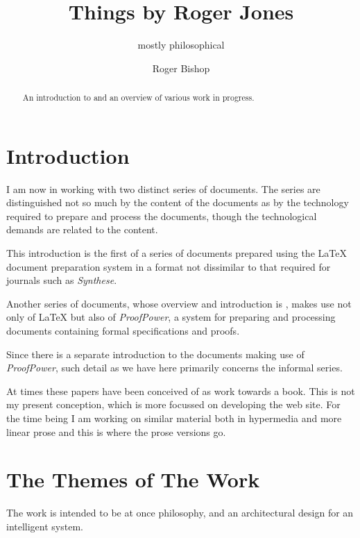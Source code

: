\documentclass[numreferences]{rbjk}
\begin{document}
                                                                                   
\begin{article}
\begin{opening}  
\title{Things by Roger Jones}
\subtitle{mostly philosophical}
\author{Roger Bishop }

\begin{abstract}
An introduction to and an overview of various work in progress.
\end{abstract}
\end{opening}

\section{Introduction}

I am now in working with two distinct series of documents.
The series are distinguished not so much by the content of the documents as by the technology required to prepare and process the documents, though the technological demands are related to the content.

This introduction is the first of a series of documents prepared using the {\LaTeX} document preparation system in a format not dissimilar to that required for journals such as {\it Synthese}.

Another series of documents, whose overview and introduction is \cite{rbjt000}, makes use not only of {\LaTeX} but also of {\it ProofPower}, a system for preparing and processing documents containing formal specifications and proofs.

Since there is a separate introduction \cite{rbjt000} to the documents making use of {\it ProofPower}, such detail as we have here primarily concerns the informal series.

At times these papers have been conceived of as work towards a book.
This is not my present conception, which is more focussed on developing the web site.
For the time being I am working on similar material both in hypermedia and more linear prose and this is where the prose versions go. 

\section{The Themes of The Work}

The work is intended to be at once philosophy, and an architectural design for an intelligent system.


\end{article}
\end{document}
